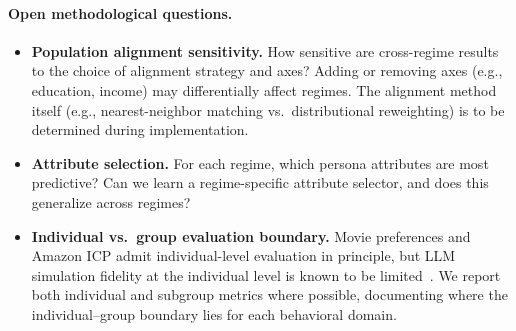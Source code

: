 \paragraph{Open methodological questions.}
\begin{itemize}
    \item \textbf{Population alignment sensitivity.} How sensitive are cross-regime results to the choice of alignment strategy and axes? Adding or removing axes (e.g., education, income) may differentially affect regimes. The alignment method itself (e.g., nearest-neighbor matching vs.\ distributional reweighting) is to be determined during implementation.
    \item \textbf{Attribute selection.} For each regime, which persona attributes are most predictive? Can we learn a regime-specific attribute selector, and does this generalize across regimes?
    \item \textbf{Individual vs.\ group evaluation boundary.} Movie preferences and Amazon ICP admit individual-level evaluation in principle, but LLM simulation fidelity at the individual level is known to be limited~\cite{wu_boundary_2025}. We report both individual and subgroup metrics where possible, documenting where the individual--group boundary lies for each behavioral domain.
\end{itemize}
